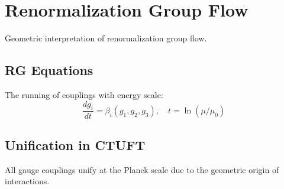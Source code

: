 \section{Renormalization Group Flow}
\label{sec:rg_flow}

Geometric interpretation of renormalization group flow.

\subsection{RG Equations}

The running of couplings with energy scale:
\begin{equation}
\frac{dg_i}{dt} = \beta_i(g_1, g_2, g_3), \quad t = \ln(\mu/\mu_0)
\end{equation}

\subsection{Unification in CTUFT}

All gauge couplings unify at the Planck scale due to the geometric origin of interactions.

